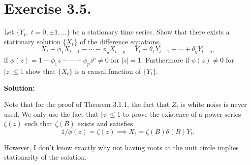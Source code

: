 \section*{Exercise 3.5.}

Let $\{Y_t,\; t = 0,\pm 1,\ldots\}$ be a stationary time series. Show that there exists a stationary solution $\{X_t\}$ of the difference equations,
\[ X_t - \phi_1 X_{t-1} - \cdots - \phi_p X_{t-p} = Y_t + \theta_1 Y_{t-1} + \cdots + \theta_q Y_{t-q}, \]
if $\phi(z) = 1 - \phi_1 z - \cdots - \phi_p z^{p} \neq 0$ for $|z| = 1$. Furthermore if $\phi(z) \neq 0$ for $|z| \leq 1$ show that $\{X_t\}$ is a causal function of $\{Y_t\}$.

\textbf{Solution:}

Note that for the proof of Theorem 3.1.1, the fact that $Z_t$ is white noise is never used. We only use the fact that $|z|\leq 1$ to prove the existence of a power series $\zeta(z)$ such that $\zeta(B)$ exists and satisfies
\[ 1/\phi(z) = \zeta(z) \implies X_t = \zeta(B) \theta(B) Y_t. \]

However, I don't know exactly why not having roots at the unit circle implies stationarity of the solution.